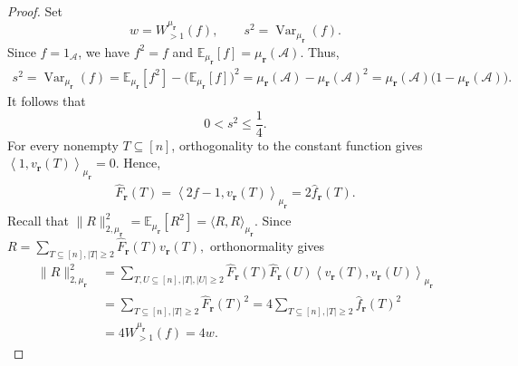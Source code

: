 \documentclass[11pt]{article}
\numberwithin{equation}{section}
\theoremstyle{definition}
\theoremstyle{remark}
\begin{document}
\begin{proof}
Set
$$
w=W_{>1}^{\mu_{\mathbf r}}(f),
\qquad
s^2=\operatorname{Var}_{\mu_{\mathbf r}}(f).
$$
Since $f=1_{\mathcal A}$, we have $f^2=f$ and
$
\mathbb E_{\mu_{\mathbf r}}[f]
=
\mu_{\mathbf r}(\mathcal A).
$
Thus,
$$
\begin{aligned}
s^2=\operatorname{Var}_{\mu_{\mathbf r}}(f)=\mathbb E_{\mu_{\mathbf r}}[f^2]
-\bigl(\mathbb E_{\mu_{\mathbf r}}[f]\bigr)^2=\mu_{\mathbf r}(\mathcal A)
-\mu_{\mathbf r}(\mathcal A)^2=\mu_{\mathbf r}(\mathcal A)
\bigl(1-\mu_{\mathbf r}(\mathcal A)\bigr).
\end{aligned}
$$
It follows that
$$
0<s^2\leq\frac14.
$$
For every nonempty $T\subseteq[n]$, orthogonality to the constant
function gives
$
\left\langle
1,v_{\mathbf r}(T)
\right\rangle_{\mu_{\mathbf r}}=0.
$
Hence,
$$
\begin{aligned}
\widehat F_{\mathbf r}(T)
=
\left\langle
2f-1,v_{\mathbf r}(T)
\right\rangle_{\mu_{\mathbf r}}=
2\widehat f_{\mathbf r}(T).
\end{aligned}
$$
Recall that
$
\|R\|_{2,\mu_{\mathbf r}}^2
=
\mathbb E_{\mu_{\mathbf r}}[R^2]
=
\langle R,R\rangle_{\mu_{\mathbf r}}.
$
Since
$
R=
\sum_{T\subseteq[n], |T|\geq2}
\widehat F_{\mathbf r}(T)v_{\mathbf r}(T),
$
orthonormality gives
$$
\begin{aligned}
\|R\|_{2,\mu_{\mathbf r}}^2
&=
\sum_{T,U\subseteq[n], |T|,|U|\geq2}
\widehat F_{\mathbf r}(T)
\widehat F_{\mathbf r}(U)
\left\langle
v_{\mathbf r}(T),v_{\mathbf r}(U)
\right\rangle_{\mu_{\mathbf r}}\\
&=
\sum_{T\subseteq[n], |T|\geq2}
\widehat F_{\mathbf r}(T)^2=
4\sum_{T\subseteq[n], |T|\geq2}
\widehat f_{\mathbf r}(T)^2\\
&=4W_{>1}^{\mu_{\mathbf r}}(f)
=4w.
\end{aligned}
$$


\end{proof}
\end{document}
